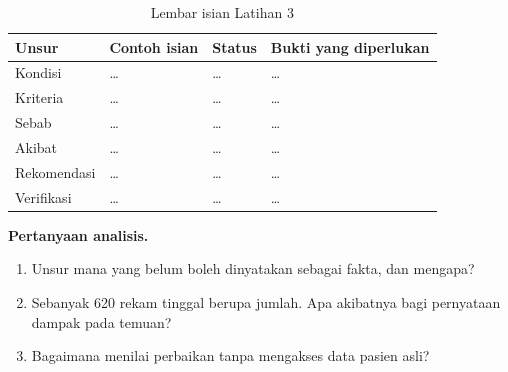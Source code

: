\begin{table}[!htb]
  \centering\small
  \caption{Lembar isian Latihan 3}\label{tab:ch12-lat3-hasil}
  \begin{tabularx}{\textwidth}{|>{\raggedright\arraybackslash}p{}|>{\raggedright\arraybackslash}X|>{\raggedright\arraybackslash}p{}|>{\raggedright\arraybackslash}p{}|}
    \hline
    \textbf{Unsur} & \textbf{Contoh isian} & \textbf{Status} & \textbf{Bukti yang diperlukan} \\
    \hline
    Kondisi & \dots & \dots & \dots \\ \hline
    Kriteria & \dots & \dots & \dots \\ \hline
    Sebab & \dots & \dots & \dots \\ \hline
    Akibat & \dots & \dots & \dots \\ \hline
    Rekomendasi & \dots & \dots & \dots \\ \hline
    Verifikasi & \dots & \dots & \dots \\ \hline
  \end{tabularx}
\end{table}

\textbf{Pertanyaan analisis.}
\begin{enumerate}
  \item Unsur mana yang belum boleh dinyatakan sebagai fakta, dan mengapa?
  \item Sebanyak 620 rekam tinggal berupa jumlah. Apa akibatnya bagi pernyataan dampak pada temuan?
  \item Bagaimana menilai perbaikan tanpa mengakses data pasien asli?
\end{enumerate}
